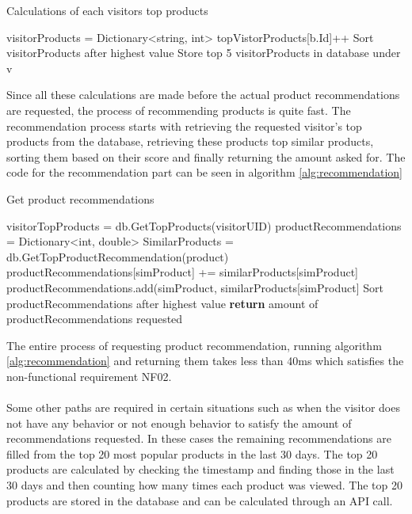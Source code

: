 \begin{algorithm}[H]
\caption{Calculations of each visitors top products}
\label{alg:topProducts}
\begin{algorithmic}[H]
\State visitorProducts = Dictionary<string, int>
\State topVistorProducts[b.Id]++
\EndFor
\State Sort visitorProducts after highest value
\State Store top 5 visitorProducts in database under v
\EndFor
\end{algorithmic}
\end{algorithm}

Since all these calculations are made before the actual product recommendations are requested, the process of recommending products is quite fast. The recommendation process starts with retrieving the requested visitor's top products from the database, retrieving these products top similar products, sorting them based on their score and finally returning the amount asked for. The code for the recommendation part can be seen in algorithm \ref{alg:recommendation}

\begin{algorithm}[H]
\caption{Get product recommendations}
\label{alg:recommendation}
\begin{algorithmic}[H]
\State visitorTopProducts = db.GetTopProducts(visitorUID)
\State productRecommendations = Dictionary<int, double>
\State SimilarProducts = db.GetTopProductRecommendation(product)
\State productRecommendations[simProduct] += similarProducts[simProduct]
\Else
\State productRecommendations.add(simProduct, similarProducts[simProduct]
\EndIf
\EndFor
\EndFor
\State Sort productRecommendations after highest value
\State \textbf{return} amount of productRecommendations requested
\State 
\end{algorithmic}
\end{algorithm}

The entire process of requesting product recommendation, running algorithm \ref{alg:recommendation} and returning them takes less than 40ms which satisfies the non-functional requirement NF02. \\\\
Some other paths are required in certain situations such as when the visitor does not have any behavior or not enough behavior to satisfy the amount of recommendations requested. In these cases the remaining recommendations are filled from the top 20 most popular products in the last 30 days. The top 20 products are calculated by checking the timestamp and finding those in the last 30 days and then counting how many times each product was viewed. The top 20 products are stored in the database and can be calculated through an API call.

